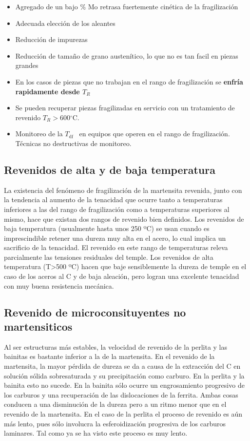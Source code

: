\documentclass{article}
\newcommand{\Tdf}{\ensuremath{T_{\mathrm{df}}}}
\newcommand{\grad}{\ensuremath{^\circ \mathrm{C}}}
\begin{document}
\begin{itemize}
    \item Agregado de un bajo \% Mo retrasa fuertemente cinética de la fragilización
    \item Adecuada elección de los aleantes
    \item Reducción de impurezas
    \item Reducción de tamaño de grano austenítico, lo que no es tan facil en piezas grandes
    \item En los casos de piezas que no trabajan en el rango de fragilización se \textbf{enfría rapidamente desde $T_R$}
    \item Se pueden recuperar piezas fragilizadas en servicio con un tratamiento de revenido $T_R>600$\grad.
    \item Monitoreo de la \Tdf~ en equipos que operen en el rango de fragilización. Técnicas no destructivas de monitoreo.
\end{itemize}

\subsection{Revenidos de alta y de baja temperatura}

La existencia del fenómeno de fragilización de la martensita revenida,
junto con la tendencia al aumento de la tenacidad que ocurre tanto a
temperaturas inferiores a las del rango de fragilización como a
temperaturas superiores al mismo, hace que existan dos rangos de
revenido bien definidos.
Los revenidos de baja temperatura (usualmente hasta unos 250 ºC) se
usan cuando es imprescindible retener una dureza muy alta en el acero,
lo cual implica un sacrificio de la tenacidad. El revenido en este rango
de temperaturas releva parcialmente las tensiones residuales del temple.
Los revenidos de alta temperatura (T>500 ºC) hacen que baje
sensiblemente la dureza de temple en el caso de los aceros al C y de baja
aleación, pero logran una excelente tenacidad con muy buena resistencia
mecánica.


\subsection{Revenido de microconsituyentes no martensiticos}

Al ser estructuras más estables, la velocidad de revenido de la perlita y
las bainitas es bastante inferior a la de la martensita.
En el revenido de la martensita, la mayor pérdida de dureza se da a causa
de la extracción del C en solución sólida sobresaturada y su precipitación
como carburo. En la perlita y la bainita esto no sucede.
En la bainita sólo ocurre un engrosamiento progresivo de los carburos y
una recuperación de las dislocaciones de la ferrita. Ambas cosas
conducen a una disminución de la dureza pero a un ritmo menor que en el
revenido de la martensita.
En el caso de la perlita el proceso de revenido es aún más lento, pues sólo
involucra la esferoidización progresiva de los carburos laminares. Tal
como ya se ha visto este proceso es muy lento.
\end{document}
